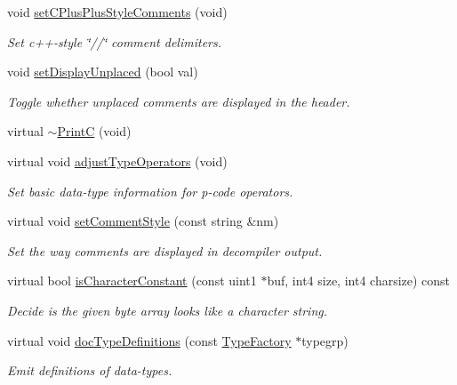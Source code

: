 \begin{DoxyCompactItemize}
void \mbox{\hyperlink{class_print_c_a4981b566fe7893b12da7d77e8cd35dfb}{set\+C\+Plus\+Plus\+Style\+Comments}} (void)
\begin{DoxyCompactList}\small\item\em Set c++-\/style \char`\"{}//\char`\"{} comment delimiters. \end{DoxyCompactList}\item 
void \mbox{\hyperlink{class_print_c_ae3479ded43276fac1cafa2a599bd6cd1}{set\+Display\+Unplaced}} (bool val)
\begin{DoxyCompactList}\small\item\em Toggle whether {\itshape unplaced} comments are displayed in the header. \end{DoxyCompactList}\item 
virtual \mbox{\hyperlink{class_print_c_a58177f1ce307faee2788320fe36dda6e}{$\sim$\+PrintC}} (void)
\item 
virtual void \mbox{\hyperlink{class_print_c_abbafadf839747f44eca5cb9f30d2bd3c}{adjust\+Type\+Operators}} (void)
\begin{DoxyCompactList}\small\item\em Set basic data-\/type information for p-\/code operators. \end{DoxyCompactList}\item 
virtual void \mbox{\hyperlink{class_print_c_a8798b0408fa3386c91f9df92f63cbd15}{set\+Comment\+Style}} (const string \&nm)
\begin{DoxyCompactList}\small\item\em Set the way comments are displayed in decompiler output. \end{DoxyCompactList}\item 
virtual bool \mbox{\hyperlink{class_print_c_ab5e875d0ce287456b2bf3f6ef5ebad35}{is\+Character\+Constant}} (const uint1 $\ast$buf, int4 size, int4 charsize) const
\begin{DoxyCompactList}\small\item\em Decide is the given byte array looks like a character string. \end{DoxyCompactList}\item 
virtual void \mbox{\hyperlink{class_print_c_a6511933f0b8fd3f2fef8aa3920aa9de6}{doc\+Type\+Definitions}} (const \mbox{\hyperlink{class_type_factory}{Type\+Factory}} $\ast$typegrp)
\begin{DoxyCompactList}\small\item\em Emit definitions of data-\/types. \end{DoxyCompactList}\item 

\end{DoxyCompactItemize}
